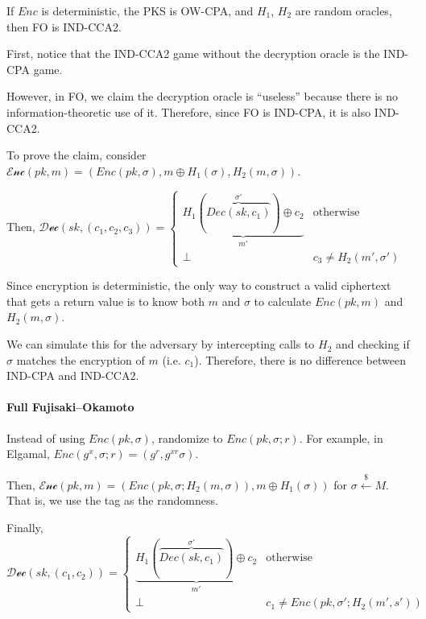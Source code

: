\documentclass[notes]{agony}
\newcommand{\xgets}{\xleftarrow}
\begin{document}
\begin{theorem}
  If $Enc$ is deterministic, the PKS is OW-CPA, and $H_1$, $H_2$ are random oracles,
  then FO is IND-CCA2.
\end{theorem}
\begin{prf}
  First, notice that the IND-CCA2 game
  without the decryption oracle is the IND-CPA game.

  However, in FO, we claim the decryption oracle is ``useless''
  because there is no information-theoretic use of it.
  Therefore, since FO is IND-CPA, it is also IND-CCA2.

  To prove the claim, consider $\mathcal{Enc}(pk,m) = (Enc(pk,\sigma), m\oplus H_1(\sigma), H_2(m,\sigma))$.

  Then, $\mathcal{Dec}(sk, (c_1,c_2,c_3)) = \begin{cases}
      \underbrace{H_1(\overbrace{Dec(sk, c_1)}^{\sigma'}) \oplus c_2}_{m'} & \text{otherwise}          \\
      \bot                                                                 & c_3 \neq H_2(m', \sigma')
    \end{cases}$

  Since encryption is deterministic,
  the only way to construct a valid ciphertext that gets a return value
  is to know both $m$ and $\sigma$ to calculate $Enc(pk,m)$ and $H_2(m,\sigma)$.

  We can simulate this for the adversary by intercepting calls to $H_2$
  and checking if $\sigma$ matches the encryption of $m$ (i.e. $c_1$).
  Therefore, there is no difference between IND-CPA and IND-CCA2.
\end{prf}

\paragraph{Full Fujisaki--Okamoto}
Instead of using $Enc(pk, \sigma)$,
randomize to $Enc(pk, \sigma; r)$.
For example, in Elgamal, $Enc(g^x, \sigma; r) = (g^r, g^{xr}\sigma)$.

Then, $\mathcal{Enc}(pk,m) = (Enc(pk,\sigma;H_2(m,\sigma)), m \oplus H_1(\sigma))$
for $\sigma \xgets{\$} M$.
That is, we use the tag as the randomness.

Finally, $\mathcal{Dec}(sk, (c_1,c_2)) = \begin{cases}
    \underbrace{H_1(\overbrace{Dec(sk, c_1)}^{\sigma'}) \oplus c_2}_{m'} & \text{otherwise}                      \\
    \bot                                                                 & c_1 \neq Enc(pk, \sigma'; H_2(m',s'))
  \end{cases}$
\end{document}

